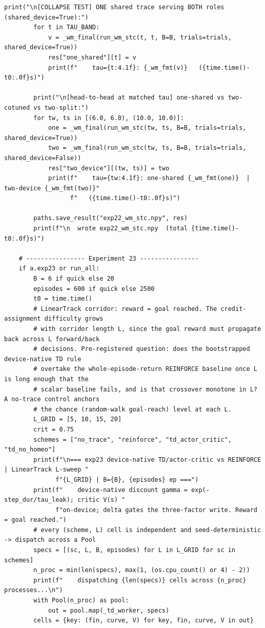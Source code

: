 \begin{lstlisting}[caption={mrl\_trace/extensions.py},label={lst:siox-src-extensions}]
        print("\n[COLLAPSE TEST] ONE shared trace serving BOTH roles (shared_device=True):")
        for t in TAU_BAND:
            v = _wm_final(run_wm_stc(t, t, B=B, trials=trials, shared_device=True))
            res["one_shared"][t] = v
            print(f"    tau={t:4.1f}: {_wm_fmt(v)}   ({time.time()-t0:.0f}s)")

        print("\n[head-to-head at matched tau] one-shared vs two-cotuned vs two-split:")
        for tw, ts in [(6.0, 6.0), (10.0, 10.0)]:
            one = _wm_final(run_wm_stc(tw, ts, B=B, trials=trials, shared_device=True))
            two = _wm_final(run_wm_stc(tw, ts, B=B, trials=trials, shared_device=False))
            res["two_device"][(tw, ts)] = two
            print(f"    tau={tw:4.1f}: one-shared {_wm_fmt(one)}  |  two-device {_wm_fmt(two)}"
                  f"   ({time.time()-t0:.0f}s)")

        paths.save_result("exp22_wm_stc.npy", res)
        print(f"\n  wrote exp22_wm_stc.npy  (total {time.time()-t0:.0f}s)")

    # ---------------- Experiment 23 ----------------
    if a.exp23 or run_all:
        B = 6 if quick else 20
        episodes = 600 if quick else 2500
        t0 = time.time()
        # LinearTrack corridor: reward = goal reached. The credit-assignment difficulty grows
        # with corridor length L, since the goal reward must propagate back across L forward/back
        # decisions. Pre-registered question: does the bootstrapped device-native TD rule
        # overtake the whole-episode-return REINFORCE baseline once L is long enough that the
        # scalar baseline fails, and is that crossover monotone in L? A no-trace control anchors
        # the chance (random-walk goal-reach) level at each L.
        L_GRID = [5, 10, 15, 20]
        crit = 0.75
        schemes = ["no_trace", "reinforce", "td_actor_critic", "td_no_homeo"]
        print(f"\n=== exp23 device-native TD/actor-critic vs REINFORCE | LinearTrack L-sweep "
              f"{L_GRID} | B={B}, {episodes} ep ===")
        print(f"    device-native discount gamma = exp(-step_dur/tau_leak); critic V(s) "
              f"on-device; delta gates the three-factor write. Reward = goal reached.")
        # every (scheme, L) cell is independent and seed-deterministic -> dispatch across a Pool
        specs = [(sc, L, B, episodes) for L in L_GRID for sc in schemes]
        n_proc = min(len(specs), max(1, (os.cpu_count() or 4) - 2))
        print(f"    dispatching {len(specs)} cells across {n_proc} processes...\n")
        with Pool(n_proc) as pool:
            out = pool.map(_td_worker, specs)
        cells = {key: (fin, curve, V) for key, fin, curve, V in out}


\end{lstlisting}
